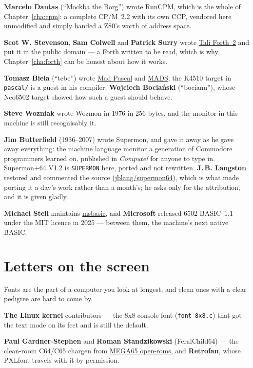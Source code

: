 \textbf{Marcelo Dantas} (``Mockba the Borg'') wrote
\href{https://github.com/MockbaTheBorg/RunCPM}{RunCPM}, which is the
whole of Chapter~\ref{cha:cpm}: a complete CP/M~2.2 with its own CCP,
vendored here unmodified and simply handed a Z80's worth of address
space.

\textbf{Scot W. Stevenson}, \textbf{Sam Colwell} and \textbf{Patrick
Surry} wrote \href{https://github.com/SamCoVT/TaliForth2}{Tali
Forth~2} and put it in the public domain --- a Forth written to be
read, which is why Chapter~\ref{cha:forth} can be honest about how it
works.

\textbf{Tomasz Biela} (``tebe'') wrote
\href{https://github.com/tebe6502/Mad-Pascal}{Mad Pascal} and
\href{https://github.com/tebe6502/Mad-Assembler}{MADS}; the K4510
target in \verb|pascal/| is a guest in his compiler.
\textbf{Wojciech Bociański} (``bocianu''), whose Neo6502 target showed
how such a guest should behave.

\textbf{Steve Wozniak} wrote Wozmon in 1976 in 256 bytes, and the
monitor in this machine is still recognisably it.

\textbf{Jim Butterfield} (1936--2007) wrote Supermon, and gave it away
as he gave away everything: the machine language monitor a generation of
Commodore programmers learned on, published in \emph{Compute!} for
anyone to type in. Supermon+64 V1.2 is \verb|SUPERMON| here, ported and
not rewritten. \textbf{J.\,B. Langston} restored and commented the
source (\href{https://github.com/jblang/supermon64}{jblang/supermon64}),
which is what made porting it a day's work rather than a month's; he asks
only for the attribution, and it is given gladly.

\textbf{Michael Steil} maintains
\href{https://github.com/mist64/msbasic}{msbasic}, and
\textbf{Microsoft} released 6502 BASIC~1.1 under the MIT licence in
2025 --- between them, the machine's next native BASIC.

\section{Letters on the screen}
Fonts are the part of a computer you look at longest, and clean ones
with a clear pedigree are hard to come by.

\textbf{The Linux kernel} contributors --- the 8x8 console font
(\verb|font_8x8.c|) that got the text mode on its feet and is still the
default.

\textbf{Paul Gardner-Stephen} and \textbf{Roman Standzikowski}
(FeralChild64) --- the clean-room C64/C65 chargen from
\href{https://github.com/MEGA65/open-roms}{MEGA65 open-roms}, and
\textbf{Retrofan}, whose PXLfont travels with it by permission.


